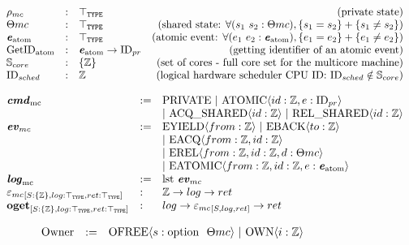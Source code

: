 \begin{figure}
\noindent{}
$$
\begin{array}{lllr}
{\rho_{mc}} &:& {\top_{{\mathrm{\texttt{TYPE}}}}} & \mbox{(private state)}\\
{\Theta{mc}} &:& {\top_{{\mathrm{\texttt{TYPE}}}}}  & \mbox{(shared state: }\forall (s_1 \ s_2: {\Theta{mc}}), \{s_1 = s_2\} + \{s_1 \neq s_2\}\mbox{)} \\
{\mathrm{\textbf{\textit{e}}}_{\mathrm{atom}}} &:& {\top_{{\mathrm{\texttt{TYPE}}}}} & \mbox{(atomic event: }\forall (e_1 \ e_2: {\mathrm{\textbf{\textit{e}}}_{\mathrm{atom}}}), \{e_1 = e_2\} + \{e_1 \neq e_2\}\mbox{)} \\
{\mathrm{GetID}_{\mathrm{atom}}} & : & {\mathrm{\textbf{\textit{e}}}_{\mathrm{atom}}} \rightarrow {\mathrm{ID}_{pr}}  & \mbox{(getting identifier of an atomic event)} \\
{\mathbb{S}_{core}} & : & \{{\mathbb{Z}}\} & \mbox{(set of cores - full core set for the multicore machine)}\\
{\mathrm{ID}_{sched}} & : & {\mathbb{Z}} & \mbox{(logical hardware scheduler CPU ID: } {\mathrm{ID}_{sched}} \notin {\mathbb{S}_{core}}\mbox{)}\\
\end{array}
$$

 $$
\begin{array}{lll}
{\mathrm{\textbf{\textit{cmd}}_{mc}}} &:=& {\mathrm{PRIVATE}} ~\vert~ {\mathrm{ATOMIC}}\langle id : {\mathbb{Z}}, e:{\mathrm{ID}_{pr}}\rangle\\
&& \vert~ {\mathrm{ACQ}\_\mathrm{SHARED}}\langle id : {\mathbb{Z}}\rangle~\vert~{\mathrm{REL}\_\mathrm{SHARED}}\langle id : {\mathbb{Z}}\rangle\\
{\mathrm{\textbf{\textit{ev}}}_{mc}} &:=& {\mathrm{EYIELD}}\langle from : {\mathbb{Z}}\rangle~\vert~ {\mathrm{EBACK}}\langle to : {\mathbb{Z}}\rangle\\
&& \vert~ {\mathrm{EACQ}}\langle from : {\mathbb{Z}}, id : {\mathbb{Z}}\rangle\\
&& \vert~{\mathrm{EREL}}\langle from :{\mathbb{Z}}, id : {\mathbb{Z}}, d:{\Theta{mc}}\rangle\\
&&\vert~{\mathrm{EATOMIC}}\langle from : {\mathbb{Z}}, id : {\mathbb{Z}}, e:{\mathrm{\textbf{\textit{e}}}_{\mathrm{atom}}}\rangle\\
{\mathrm{\textbf{\textit{log}}}_{\mathrm{mc}}} & := & \mathrm{lst}\ {\mathrm{\textbf{\textit{ev}}}_{mc}}\\
{{{\varepsilon_{mc}}}_{[{S : \{{\mathbb{Z}}\}}, {log : {\top_{{\mathrm{\texttt{TYPE}}}}}}, {ret: {\top_{{\mathrm{\texttt{TYPE}}}}}}]}} & : &  {\mathbb{Z}} \rightarrow log \rightarrow ret \\
{\mathrm{\textbf{oget}}}_{[S: \{{\mathbb{Z}}\}, log : {\top_{{\mathrm{\texttt{TYPE}}}}}, ret : {\top_{{\mathrm{\texttt{TYPE}}}}}]} & : &   log \rightarrow {{{\varepsilon_{mc}}}_{[{S}, {log}, {ret}]}} \rightarrow ret \\
\end{array}
$$

\noindent{}

$$
\begin{array}{llll}
{\mathrm{Owner}} & := & {\mathrm{OFREE}}\langle s : {\mathrm{option}~{~}}{\Theta{mc}}\rangle~\vert~{\mathrm{OWN}}\langle i : {\mathbb{Z}}\rangle \\
\end{array}
$$



\end{figure}
